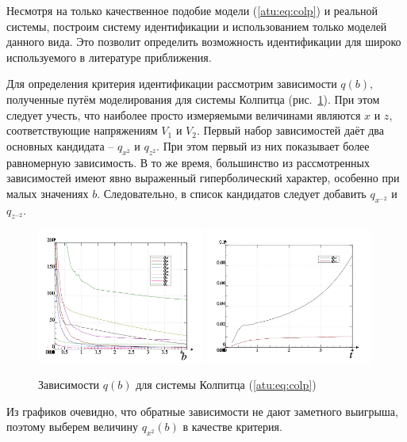 Несмотря на только качественное подобие модели (\ref{atu:eq:colp})
и реальной системы, построим систему идентификации
и использованием только моделей данного вида.
Это позволит определить возможность идентификации
для широко используемого в литературе приближения.

Для определения критерия идентификации рассмотрим зависимости
$q(b) $, полученные путём моделирования
для системы Колпитца (рис.~\ref{atu:f:colp_q}).
При этом следует учесть, что наиболее просто измеряемыми величинами являются $x$ и $z$,
соответствующие напряжениям $V_1$ и $V_2$.
Первый набор зависимостей даёт два основных кандидата -- $q_{x^2}$ и $q_{z^2}$.
При этом первый из них показывает более равномерную зависимость.
В то же время, большинство из рассмотренных зависимостей имеют явно
выраженный гиперболический характер, особенно при малых значениях $b$.
Следовательно, в список кандидатов следует добавить $q_{x^{-2}} $ и $q_{z^{-2}}$.

\begin{figure}[htb!]
\centerline{
  \includegraphics[width=0.49\textwidth]{p/mod/colp_p-p_b_e.png}
  \includegraphics[width=0.49\textwidth]{p/mod/colp_p-p_b_1ex2.png}
}
  \caption{Зависимости $q(b) $ для системы Колпитца (\ref{atu:eq:colp})}
\label{atu:f:colp_q}
\end{figure}

Из графиков очевидно, что
обратные зависимости не дают заметного выигрыша, поэтому выберем
величину $ q_{x^2}(b) $ в качестве критерия.

